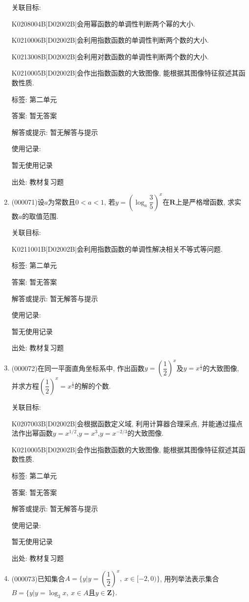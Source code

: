 \documentclass[10pt,a4paper]{article}
\begin{document}
\begin{enumerate}[1.]
关联目标:

K0208004B|D02002B|会用幂函数的单调性判断两个幂的大小.

K0210006B|D02002B|会利用指数函数的单调性判断两个数的大小.

K0213008B|D02002B|会利用对数函数的单调性判断两个数的大小.

K0210005B|D02002B|会作出指数函数的大致图像, 能根据其图像特征叙述其函数性质.



标签: 第二单元

答案: 暂无答案

解答或提示: 暂无解答与提示

使用记录:

暂无使用记录


出处: 教材复习题
\item { (000071)}设$a$为常数且$0<a<1$, 若$y=(\log_a \dfrac 35)^x$在$\mathbf{R}$上是严格增函数, 求实数$a$的取值范围.


关联目标:

K0211001B|D02002B|会利用指数函数的单调性解决相关不等式等问题.



标签: 第二单元

答案: 暂无答案

解答或提示: 暂无解答与提示

使用记录:

暂无使用记录


出处: 教材复习题
\item { (000072)}在同一平面直角坐标系中, 作出函数$y=(\dfrac 12)^x$及$y=x^{\frac 12}$的大致图像, 并求方程$(\dfrac 12)^x=x^{\frac 12}$的解的个数.


关联目标:

K0207003B|D02002B|会根据函数定义域, 利用计算器合理采点, 并能通过描点法作出幂函数$y=x^{1/2}$,$y=x^{3}$,$y=x^{-2/3}$的大致图像.

K0210005B|D02002B|会作出指数函数的大致图像, 能根据其图像特征叙述其函数性质.



标签: 第二单元

答案: 暂无答案

解答或提示: 暂无解答与提示

使用记录:

暂无使用记录


出处: 教材复习题
\item { (000073)}已知集合$A=\{y|y=(\dfrac 12)^x,\  x\in [-2, 0)\}$, 用列举法表示集合$B=\{y|y=\log_3x,\  x\in A\text{且}y\in \mathbf{Z}\}$.



\end{enumerate}
\end{document}
